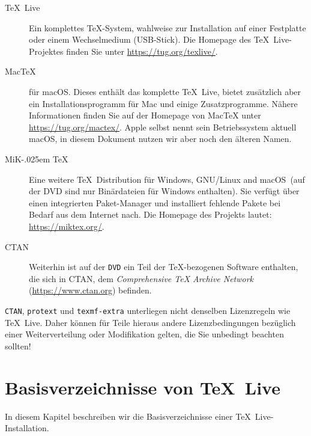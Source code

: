 \documentclass[12pt,ngerman,a4paper,fullparskip]{scrreprt}
\newcommand{\TL}{\TeX\ Live\xspace}
\newcommand{\acro}[1]{\texttt{#1}}
\newcommand{\dirname}[1]{\texttt{#1}}
\newcommand{\pkgname}[1]{\texttt{#1}}
\newcommand\MIKTEX{MiK\kern-.025em \TeX}%
\providecommand*{\CTAN}{\acro{CTAN}\xspace}
\providecommand*{\DVD}{\acro{DVD}\xspace}
\providecommand*{\macOS}{macOS\xspace}
\begin{document}
\begin{description}
\item[\TL] Ein komplettes \TeX-System, wahlweise zur Installation auf einer Festplatte oder einem Wechselmedium (USB-Stick). Die Homepage des \TL-Projektes finden Sie unter \url{https://tug.org/texlive/}.

\item[Mac\TeX] für \macOS. Dieses enthält das komplette \TL, bietet zusätzlich aber ein Installationsprogramm für Mac und einige Zusatzprogramme. Nähere Informationen finden Sie auf der Homepage von Mac\TeX{} unter \url{https://tug.org/mactex/}. Apple selbst nennt sein Betriebssystem aktuell macOS, in diesem Dokument nutzen wir aber noch den älteren Namen.

\item [\MIKTEX] Eine weitere \TeX\ Distribution für Windows, GNU/Linux and \macOS\ (auf der DVD sind nur Binärdateien für Windows enthalten). Sie verfügt über einen integrierten Paket-Manager und installiert fehlende Pakete bei Bedarf aus dem Internet nach. Die Homepage des Projekts lautet:
\url{https://miktex.org/}.

\item[CTAN] Weiterhin ist auf der \DVD{} ein Teil der \TeX-bezogenen Software enthalten, die sich
in CTAN, dem \emph{Comprehensive \TeX{} Archive Network} (\url{https://www.ctan.org}) befinden.
\end{description}

\CTAN{}, \pkgname{protext} und \dirname{texmf-extra} unterliegen nicht denselben Lizenzregeln wie \TL. Daher können für Teile hieraus andere Lizenzbedingungen bezüglich einer Weiterverteilung oder
Modifikation gelten, die Sie unbedingt beachten sollten!

\section{Basisverzeichnisse von \TL}\label{sec:tld}

In diesem Kapitel beschreiben wir die Basisverzeichnisse einer \TL-Installation.
\end{document}
